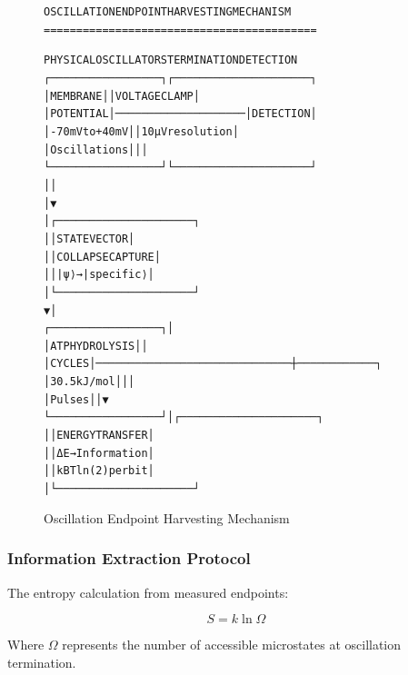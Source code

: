 \documentclass[11pt,a4paper]{article}
\newenvironment{asciiart}{\begin{alltt}}{\end{alltt}}
\begin{document}
\begin{figure}[H]
\centering
\begin{asciiart}
OSCILLATION ENDPOINT HARVESTING MECHANISM
==========================================

PHYSICAL OSCILLATORS                    TERMINATION DETECTION
┌─────────────────┐                    ┌─────────────────────┐
│ MEMBRANE        │                    │ VOLTAGE CLAMP       │
│ POTENTIAL       │────────────────────│ DETECTION           │
│ -70mV to +40mV  │                    │ 10μV resolution     │
│ Oscillations    │                    │                     │
└─────────────────┘                    └─────────────────────┘
         │                                        │
         │                                        ▼
         │                             ┌─────────────────────┐
         │                             │ STATE VECTOR        │
         │                             │ COLLAPSE CAPTURE    │
         │                             │ |ψ⟩ → |specific⟩    │
         │                             └─────────────────────┘
         ▼                                        │
┌─────────────────┐                              │
│ ATP HYDROLYSIS  │                              │
│ CYCLES          │──────────────────────────────┼────────────┐
│ 30.5 kJ/mol     │                              │            │
│ Pulses          │                              │            ▼
└─────────────────┘                              │  ┌─────────────────────┐
                                                 │  │ ENERGY TRANSFER     │
                                                 │  │ ΔE → Information    │
                                                 │  │ kBT ln(2) per bit   │
                                                 │  └─────────────────────┘
\end{asciiart}
\caption{Oscillation Endpoint Harvesting Mechanism}
\end{figure}

\subsubsection{Information Extraction Protocol}

The entropy calculation from measured endpoints:

\begin{equation}
S = k \ln \Omega
\end{equation}

Where $\Omega$ represents the number of accessible microstates at oscillation termination.
\end{document}
